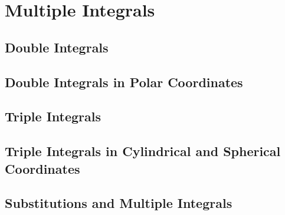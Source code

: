 \section{Multiple Integrals}

\subsection{Double Integrals}

\subsection{Double Integrals in Polar Coordinates}

\subsection{Triple Integrals}

\subsection{Triple Integrals in Cylindrical and Spherical Coordinates}

\subsection{Substitutions and Multiple Integrals}